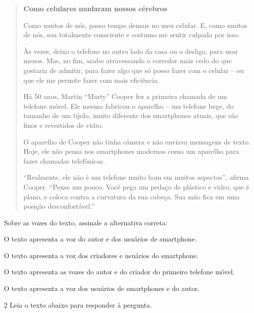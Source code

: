 \begin{quote}

\textbf{Como celulares mudaram nossos cérebros}

Como muitos de nós, passo tempo demais no meu celular. E, como muitos de
nós, sou totalmente consciente e costumo me sentir culpada por isso.

Às vezes, deixo o telefone no outro lado da casa ou o desligo, para usar
menos. Mas, no fim, acabo atravessando o corredor mais cedo do que
gostaria de admitir, para fazer algo que só posso fazer com o celular --
ou que ele me permite fazer com mais eficiência.

Há 50 anos, Martin ``Marty'' Cooper fez a primeira chamada de um
telefone móvel. Ele mesmo fabricou o aparelho -- um telefone bege, do
tamanho de um tijolo, muito diferente dos smartphones atuais, que são
finos e revestidos de vidro.

O aparelho de Cooper não tinha câmera e não enviava mensagens de texto.
Hoje, ele não pensa nos smartphones modernos como um aparelho
para fazer chamadas telefônicas.

``Realmente, ele não é um telefone muito bom em muitos aspectos'',
afirma Cooper. ``Pense um pouco. Você pega um pedaço de plástico e
vidro, que é plano, e coloca contra a curvatura da sua cabeça. Sua mão
fica em uma posição desconfortável.''

\end{quote}


Sobre as vozes do texto, assinale a alternativa correta:

\begin{escolha}
  
  \item O texto apresenta a voz do autor e dos usuários de smartphone.
  
  \item O texto apresenta a voz dos criadores e usuários do smartphone.
  
  \item O texto apresenta as vozes do autor e do criador do primeiro telefone móvel.
  
  \item O texto apresenta a voz dos usuários de smartphones e do autor.

\end{escolha}


\num{2} Leia o texto abaixo para responder à pergunta.

